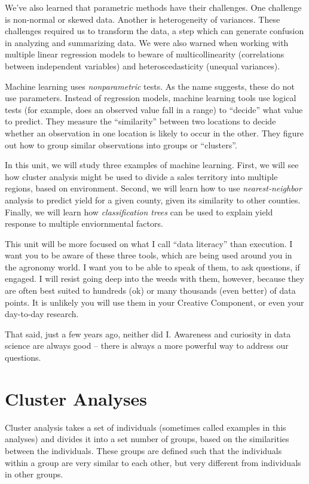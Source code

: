 \documentclass[
]{book}
\begin{document}
We've also learned that parametric methods have their challenges. One challenge is non-normal or skewed data. Another is heterogeneity of variances. These challenges required us to transform the data, a step which can generate confusion in analyzing and summarizing data. We were also warned when working with multiple linear regression models to beware of multicollinearity (correlations between independent variables) and heteroscedasticity (unequal variances).

Machine learning uses \emph{nonparametric} tests. As the name suggests, these do not use parameters. Instead of regression models, machine learning tools use logical tests (for example, does an observed value fall in a range) to ``decide'' what value to predict. They measure the ``similarity'' between two locations to decide whether an observation in one location is likely to occur in the other. They figure out how to group similar observations into groups or ``clusters''.

In this unit, we will study three examples of machine learning. First, we will see how cluster analysis might be used to divide a sales territory into multiple regions, based on environment. Second, we will learn how to use \emph{nearest-neighbor} analysis to predict yield for a given county, given its similarity to other counties. Finally, we will learn how \emph{classification trees} can be used to explain yield response to multiple enviornmental factors.

This unit will be more focused on what I call ``data literacy'' than execution. I want you to be aware of these three tools, which are being used around you in the agronomy world. I want you to be able to speak of them, to ask questions, if engaged. I will resist going deep into the weeds with them, however, because they are often best suited to hundreds (ok) or many thousands (even better) of data points. It is unlikely you will use them in your Creative Component, or even your day-to-day research.

That said, just a few years ago, neither did I. Awareness and curiosity in data science are always good -- there is always a more powerful way to address our questions.

\hypertarget{cluster-analyses}{%
\section{Cluster Analyses}\label{cluster-analyses}}

Cluster analysis takes a set of individuals (sometimes called examples in this analyses) and divides it into a set number of groups, based on the similarities between the individuals. These groups are defined such that the individuals within a group are very similar to each other, but very different from individuals in other groups.
\end{document}
